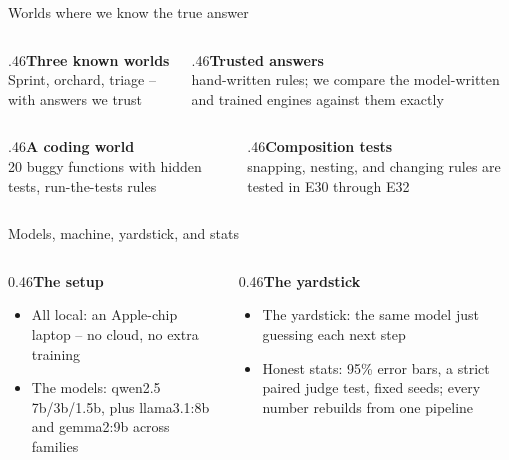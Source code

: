 \documentclass[aspectratio=169,11pt]{beamer}
\begin{document}
\begin{frame}{Worlds where we know the true answer}\vfill\begin{columns}[T]\begin{column}{.46\textwidth}{\color{owdeep}\bfseries Three known worlds}\\[2pt]{\color{owmuted}\small Sprint, orchard, triage -- with answers we trust}\end{column}\begin{column}{.46\textwidth}{\color{owdeep}\bfseries Trusted answers}\\[2pt]{\color{owmuted}\small hand-written rules; we compare the model-written and trained engines against them exactly}\end{column}\end{columns}\vskip12pt\begin{columns}[T]\begin{column}{.46\textwidth}{\color{owdeep}\bfseries A coding world}\\[2pt]{\color{owmuted}\small 20 buggy functions with hidden tests, run-the-tests rules}\end{column}\begin{column}{.46\textwidth}{\color{owdeep}\bfseries Composition tests}\\[2pt]{\color{owmuted}\small snapping, nesting, and changing rules are tested in E30 through E32}\end{column}\end{columns}\vfill\end{frame}
\begin{frame}{Models, machine, yardstick, and stats}\vfill
\begin{columns}[T]
\begin{column}{0.46\textwidth}{\color{owmuted}\bfseries\large The setup}\par\medskip\begin{itemize}\small \item All local: an Apple-chip laptop -- no cloud, no extra training
\item The models: qwen2.5 7b/3b/1.5b, plus llama3.1:8b and gemma2:9b across families\end{itemize}\end{column}
\begin{column}{0.46\textwidth}{\color{owteal}\bfseries\large The yardstick}\par\medskip\begin{itemize}\small \item The yardstick: the same model just guessing each next step
\item Honest stats: 95\% error bars, a strict paired judge test, fixed seeds; every number rebuilds from one pipeline\end{itemize}\end{column}
\end{columns}\vfill\end{frame}
\end{document}
